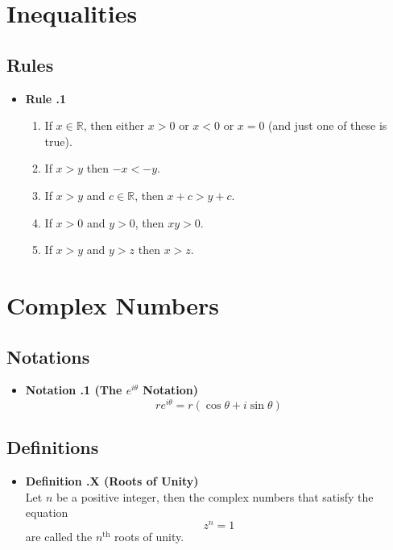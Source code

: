 \documentclass[a4paper,12pt]{article}
\newcommand{\defi}[1]{
    \item \textbf{Definition \thesection.#1}\\
}
\newcommand{\rul}[1]{
    \item \textbf{Rule \thesection.#1}\\
}
\newcommand{\nota}[1]{
    \item \textbf{Notation \thesection.#1}\\
}
\begin{document}
\section{Inequalities}
\subsection{Rules}
\begin{itemize}
    \item \textbf{Rule \thesection.1}  %
    \begin{enumerate}
        \item If $x \in \mathbb{R}$, then either $x>0$ or $x<0$ or $x=0$ (and just one of these is true).
        \item If $x>y$ then $-x<-y$.
        \item If $x>y$ and $c \in \mathbb{R}$, then $x + c > y + c$.
        \item If $x > 0$ and $y > 0$, then $xy > 0$.
        \item If $x>y$ and $y>z$ then $x>z$.
    \end{enumerate}
\end{itemize}

\section{Complex Numbers}
\subsection{Notations}
\begin{itemize}
    \item \textbf{Notation \thesection.1 (The $e^{i\theta}$ Notation)} %
        $$ re^{i\theta} = r(\cos\theta + i\sin\theta) $$
\end{itemize}

\subsection{Definitions}
\begin{itemize}
    \defi {X (Roots of Unity)}
    Let $n$ be a positive integer, then the complex numbers that satisfy the equation
        $$ z^n = 1 $$
    are called the $n^\text{th}$ roots of unity.
\end{itemize}
\end{document}
